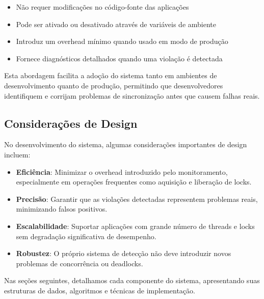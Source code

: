 \begin{itemize}
    \item Não requer modificações no código-fonte das aplicações
    \item Pode ser ativado ou desativado através de variáveis de ambiente
    \item Introduz um overhead mínimo quando usado em modo de produção
    \item Fornece diagnósticos detalhados quando uma violação é detectada
\end{itemize}

Esta abordagem facilita a adoção do sistema tanto em ambientes de desenvolvimento quanto de produção, permitindo que desenvolvedores identifiquem e corrijam problemas de sincronização antes que causem falhas reais.

\subsection{Considerações de Design}

No desenvolvimento do sistema, algumas considerações importantes de design incluem:

\begin{itemize}
    \item \textbf{Eficiência}: Minimizar o overhead introduzido pelo monitoramento, especialmente em operações frequentes como aquisição e liberação de locks.

    \item \textbf{Precisão}: Garantir que as violações detectadas representem problemas reais, minimizando falsos positivos.

    \item \textbf{Escalabilidade}: Suportar aplicações com grande número de threads e locks sem degradação significativa de desempenho.

    \item \textbf{Robustez}: O próprio sistema de detecção não deve introduzir novos problemas de concorrência ou deadlocks.
\end{itemize}

Nas seções seguintes, detalhamos cada componente do sistema, apresentando suas estruturas de dados, algoritmos e técnicas de implementação.
